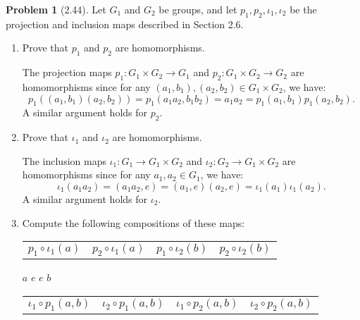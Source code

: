 \documentclass[12pt]{article}
\theoremstyle{definition}
\newtheorem{problem}{Problem}
\begin{document}
\begin{problem}[2.44]
    Let $G_1$ and $G_2$ be groups, and let $p_1, p_2, \iota_1, \iota_2$ be the projection and inclusion maps described in Section 2.6.
    \begin{enumerate}[label=(\alph*)]
        \item Prove that $p_1$ and $p_2$ are homomorphisms.
        
        \begin{solution}
            The projection maps $p_1 : G_1 \times G_2 \to G_1$ and $p_2 : G_1 \times G_2 \to G_2$ are homomorphisms since for any $(a_1, b_1), (a_2, b_2) \in G_1 \times G_2$, we have:
            \[
            p_1((a_1, b_1)(a_2, b_2)) = p_1(a_1 a_2, b_1 b_2) = a_1 a_2 = p_1(a_1, b_1) p_1(a_2, b_2).
            \]
            A similar argument holds for $p_2$.
        \end{solution}
        \item Prove that $\iota_1$ and $\iota_2$ are homomorphisms.
        
        \begin{solution}
            The inclusion maps $\iota_1 : G_1 \to G_1 \times G_2$ and $\iota_2 : G_2 \to G_1 \times G_2$ are homomorphisms since for any $a_1, a_2 \in G_1$, we have:
            \[
            \iota_1(a_1 a_2) = (a_1 a_2, e) = (a_1, e)(a_2, e) = \iota_1(a_1) \iota_1(a_2).
            \]
            A similar argument holds for $\iota_2$.
        \end{solution}
        \item Compute the following compositions of these maps:
        
        \renewcommand{\arraystretch}{1} %
        \begin{tabular}{m{3.4cm} m{3.4cm} m{3.4cm} m{3.4cm}}
            $p_1 \circ \iota_1(a)$ & $p_2 \circ \iota_1(a)$ & $p_1 \circ \iota_2(b)$ & $p_2 \circ \iota_2(b)$ \\ 
        \end{tabular}

        \begin{solution} 
            \hspace{25px}$a$ \hspace{100px}$e$ \hspace{100px}$e$ \hspace{100px}$b$ 
        \end{solution}
            
        \begin{tabular}{m{3.4cm} m{3.4cm} m{3.4cm} m{3.4cm}}
            $\iota_1 \circ p_1(a, b)$ & $\iota_2 \circ p_1(a, b)$ & $\iota_1 \circ p_2(a, b)$ & $\iota_2 \circ p_2(a, b)$ \\ 
        \end{tabular}


\end{enumerate}
\end{problem}
\end{document}
